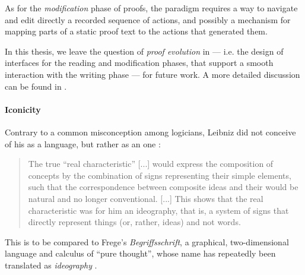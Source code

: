 As for the \emph{modification} phase of proofs, the  paradigm requires a way
to navigate and edit directly a recorded sequence of actions, and possibly a
mechanism for mapping parts of a static proof text to the actions that generated
them.

\begin{emphpar}
  In this thesis, we leave the question of \emph{proof evolution} in  ---
  i.e. the design of interfaces for the reading and modification phases, that
  support a smooth interaction with the writing phase --- for future work. A
  more detailed discussion can be found in .
\end{emphpar}

\paragraph{Iconicity}


Contrary to a common misconception among logicians, Leibniz did not conceive of
his  as a  language, but rather as an
\emph{} one :
\begin{quote}
    The true ``real characteristic'' [...] would express the composition of
    concepts by the combination of signs representing their simple elements,
    such that the correspondence between composite ideas and their  would
    be natural and no longer conventional. [...] This shows that the real
    characteristic was for him an ideography, that is, a system of signs that
    directly represent things (or, rather, ideas) and not words.
\end{quote}
This is to be compared to Frege's \textit{Begriffsschrift}, a graphical,
two-dimensional language and calculus of ``pure thought'', whose name has
repeatedly been translated as \emph{ideography}
.

